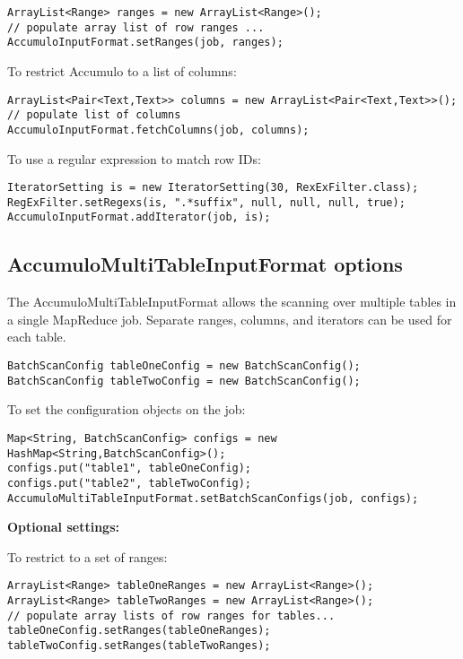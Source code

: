 \small
\begin{verbatim}
ArrayList<Range> ranges = new ArrayList<Range>();
// populate array list of row ranges ...
AccumuloInputFormat.setRanges(job, ranges);
\end{verbatim}
\normalsize

To restrict Accumulo to a list of columns:

\small
\begin{verbatim}
ArrayList<Pair<Text,Text>> columns = new ArrayList<Pair<Text,Text>>();
// populate list of columns
AccumuloInputFormat.fetchColumns(job, columns);
\end{verbatim}
\normalsize

To use a regular expression to match row IDs:

\small
\begin{verbatim}
IteratorSetting is = new IteratorSetting(30, RexExFilter.class);
RegExFilter.setRegexs(is, ".*suffix", null, null, null, true);
AccumuloInputFormat.addIterator(job, is);
\end{verbatim}
\normalsize

\subsection{AccumuloMultiTableInputFormat options}

The AccumuloMultiTableInputFormat allows the scanning over multiple tables 
in a single MapReduce job. Separate ranges, columns, and iterators can be 
used for each table. 

\small
\begin{verbatim}
BatchScanConfig tableOneConfig = new BatchScanConfig();
BatchScanConfig tableTwoConfig = new BatchScanConfig();
\end{verbatim}
\normalsize

To set the configuration objects on the job:

\small
\begin{verbatim}
Map<String, BatchScanConfig> configs = new HashMap<String,BatchScanConfig>();
configs.put("table1", tableOneConfig);
configs.put("table2", tableTwoConfig);
AccumuloMultiTableInputFormat.setBatchScanConfigs(job, configs);
\end{verbatim}
\normalsize

\Large
\textbf{Optional settings:}
\normalsize

To restrict to a set of ranges:

\small
\begin{verbatim}
ArrayList<Range> tableOneRanges = new ArrayList<Range>();
ArrayList<Range> tableTwoRanges = new ArrayList<Range>();
// populate array lists of row ranges for tables...
tableOneConfig.setRanges(tableOneRanges);
tableTwoConfig.setRanges(tableTwoRanges);
\end{verbatim}
\normalsize

